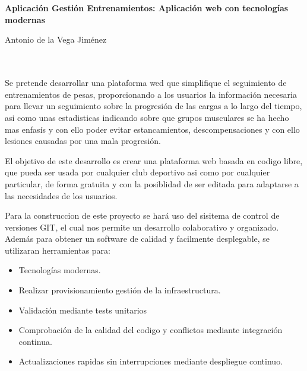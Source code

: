 \chapter*{}






\cleardoublepage
\thispagestyle{empty}

\begin{center}
{\large\bfseries Aplicación Gestión Entrenamientos: Aplicación web con tecnologías modernas}\\
\end{center}
\begin{center}
Antonio de la Vega Jiménez\\
\end{center}

\\

\vspace{0.7cm}
\\

Se pretende desarrollar una plataforma wed que simplifique el seguimiento de entrenamientos de pesas, proporcionando a los usuarios la información necesaria para llevar un seguimiento sobre la progresión de las cargas a lo largo del tiempo, asi como unas estadisticas indicando sobre que grupos musculares se ha hecho mas enfasís y con ello poder evitar estancamientos, descompensaciones y con ello lesiones causadas por una mala progresión.

El objetivo de este desarrollo es crear una plataforma web basada en codigo libre, que pueda ser usada por cualquier club deportivo asi como por cualquier particular, de forma gratuita y con la posiblidad de ser editada para adaptarse a las necesidades de los usuarios.


Para la construccion de este proyecto se hará uso del sisitema de control de versiones GIT, el cual nos permite un desarrollo colaborativo y organizado. Además para obtener un software de calidad y facilmente desplegable, se utilizaran herramientas para:
\begin{itemize}
  \item Tecnologías modernas.
  \item Realizar provisionamiento gestión de la infraestructura.
  \item Validación mediante tests unitarios
  \item Comprobación de la calidad del codigo y conflictos mediante integración continua.
  \item Actualizaciones rapidas sin interrupciones mediante despliegue continuo.
\end{itemize}

